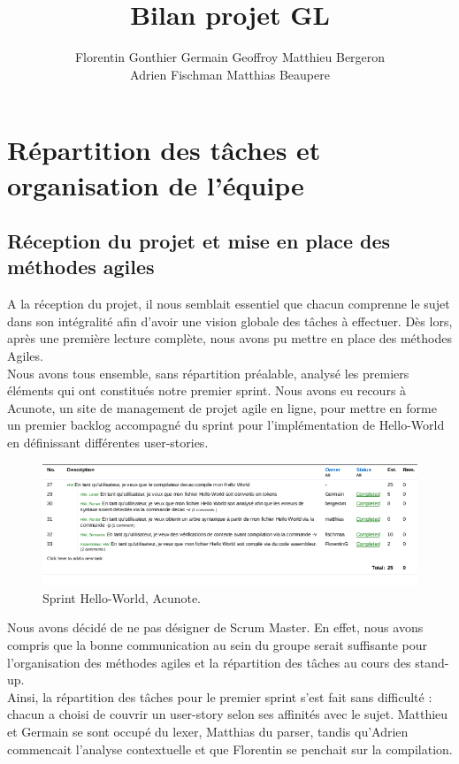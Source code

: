 \documentclass{article}
\title{Bilan projet GL}
\author{Florentin Gonthier Germain Geoffroy Matthieu Bergeron \\ Adrien Fischman Matthias Beaupere}
\begin{document}
\maketitle

\section{Répartition des tâches et organisation de l'équipe}

\subsection{Réception du projet et mise en place des méthodes agiles}
A la réception du projet, il nous semblait essentiel que chacun comprenne le sujet dans son intégralité afin d'avoir une vision globale des tâches à effectuer. Dès lors, après une première lecture complète, nous avons pu mettre en place des méthodes Agiles.\\
Nous avons tous ensemble, sans répartition préalable, analysé les premiers éléments qui ont constitués notre premier sprint. Nous avons eu recours à Acunote, un site de management de projet agile en ligne, pour mettre en forme un premier backlog accompagné du sprint pour l'implémentation de Hello-World en définissant différentes user-stories.\\
\begin{figure}[h!]
    \centering
    \includegraphics[scale=0.7]{sprintHelloWorld1.png}
    \caption{Sprint Hello-World, Acunote.}
    \label{fig:Sprint Hello-World}
\end{figure}
Nous avons décidé de ne pas désigner de Scrum Master. En effet, nous avons compris que la bonne communication au sein du groupe serait suffisante pour l'organisation des méthodes agiles et la répartition des tâches au cours des stand-up. \\
Ainsi, la répartition des tâches pour le premier sprint s'est fait sans difficulté : chacun a choisi de couvrir un user-story selon ses affinités avec le sujet. Matthieu et Germain se sont occupé du lexer, Matthias du parser, tandis qu'Adrien commencait l'analyse contextuelle et que Florentin se penchait sur la compilation. \\
\\
\end{document}

